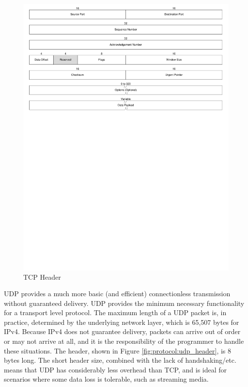 \begin{landscape}
	\begin{figure}[p]
		\begin{centering}
			\includegraphics{Protocol/Figures/protocol-tcp_header.pdf}
			\caption[TCP Header]{TCP Header \cite{ref:2005-kozierok-tcpip_guide}}
			\label{fig:protocol:tcp_header}
		\end{centering}
	\end{figure}
\end{landscape}

UDP provides a much more basic (and efficient) connectionless transmission without guaranteed delivery. UDP provides the minimum necessary functionality for a transport level protocol. The maximum length of a UDP packet is, in practice, determined by the underlying network layer, which is 65,507 bytes for IPv4. Because IPv4 does not guarantee delivery, packets can arrive out of order or may not arrive at all, and it is the responsibility of the programmer to handle these situations. The header, shown in Figure \ref{fig:protocol:udp_header}, is 8 bytes long. The short header size, combined with the lack of handshaking/etc. means that UDP has considerably less overhead than TCP, and is ideal for scenarios where some data loss is tolerable, such as streaming media. \cite{ref:2005-kozierok-tcpip_guide}

